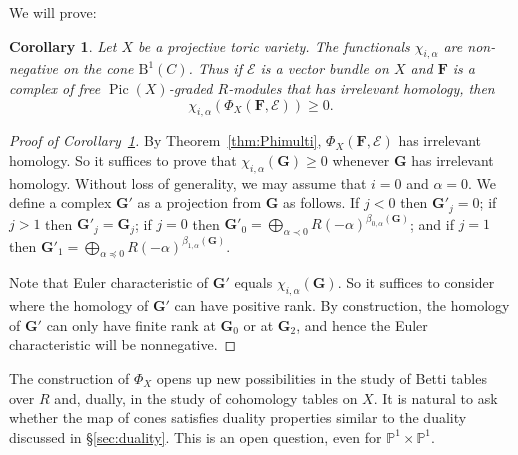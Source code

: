 \documentclass[12pt]{amsart}
\newtheorem{cor}[lemma]{Corollary}
\theoremstyle{definition}
\theoremstyle{remark}
\newcommand{\Pic}{\operatorname{Pic}}
\newcommand{\PP}{\mathbb{P}}
\newcommand{\cE}{\mathcal{E}}
\newcommand{\FF}{\mathbf{F}}
\newcommand{\Gbull}{\mathbf{G}}
\newcommand{\BBQ}{\mathrm{B}}
\begin{document}
We will prove:
\begin{cor}\label{cor:chiialpha}
Let $X$ be a projective toric variety. The functionals $\chi_{i,\alpha}$ are non-negative
on the cone $\BBQ^1(C)$. Thus if $\cE$ is a vector bundle on $X$ and $\FF$ is a complex of free
$\Pic(X)$-graded 
$R$-modules that has irrelevant homology, then
\[
\chi_{i,\alpha}( \Phi_X(\FF, \cE))\geq 0.
\]
\end{cor}


\begin{proof}[Proof of Corollary~\ref{cor:chiialpha}]
By Theorem~\ref{thm:Phimulti}, $\Phi_X(\FF,\cE)$ has irrelevant homology.  So it suffices to prove that $\chi_{i,\alpha}(\Gbull)\geq 0$ whenever $\Gbull$ has irrelevant homology.  Without loss of generality, we may assume that $i=0$ and $\alpha=0$.  We define a complex $\Gbull'$ as a projection from $\Gbull$ as follows.  If $j<0$ then $\Gbull'_j=0$; if $j>1$ then $\Gbull'_j=\Gbull_j$; if $j=0$ then $\Gbull'_0=\bigoplus_{\alpha\prec 0} R(-\alpha)^{\beta_{0,\alpha}(\Gbull)}$; and if $j=1$ then $\Gbull'_1=\bigoplus_{\alpha\preceq 0} R(-\alpha)^{\beta_{1,\alpha}(\Gbull)}$.  

Note that Euler characteristic of $\Gbull'$ equals $\chi_{i,\alpha}(\Gbull)$.  So it suffices to consider where the homology of $\Gbull'$ can have positive rank.  By construction, the homology of $\Gbull'$ can only have finite rank at $\Gbull_0$ or at $\Gbull_2$, and hence the Euler characteristic will be nonnegative.
\end{proof}

The construction of $\Phi_X$ opens up new possibilities in the study of Betti tables over $R$ and, dually, in the study of cohomology tables on $X$.  
It is natural to ask whether
the map of cones satisfies duality properties similar to the duality discussed in \S\ref{sec:duality}.  This is an open question, even for $\PP^1\times \PP^1$.
\end{document}
